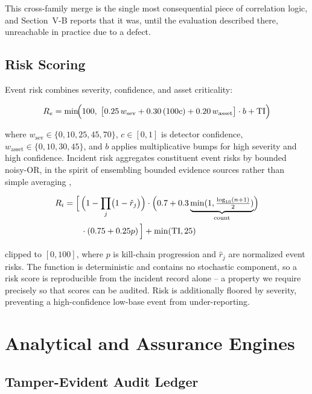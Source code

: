 \documentclass[conference]{IEEEtran}
\begin{document}
This cross-family merge is the single most consequential piece of
correlation logic, and Section~V-B reports that it was, until the evaluation
described there, unreachable in practice due to a defect.

\subsection{Risk Scoring}

Event risk combines severity, confidence, and asset criticality:

\begin{equation}
R_e = \min\!\Bigl(100,\;\bigl[0.25\,w_{\text{sev}} + 0.30\,(100 c) + 0.20\,w_{\text{asset}}\bigr] \cdot b + \text{TI}\Bigr)
\end{equation}

\noindent where $w_{\text{sev}} \in \{0,10,25,45,70\}$, $c \in [0,1]$ is
detector confidence, $w_{\text{asset}} \in \{0,10,30,45\}$, and $b$ applies
multiplicative bumps for high severity and high confidence. Incident risk
aggregates constituent event risks by bounded noisy-OR, in the spirit of
ensembling bounded evidence sources rather than simple averaging \cite{breiman2001random},

\begin{align}
R_i &= \Bigl[\,\Bigl(1 - \prod_{j}\bigl(1 - \hat{r}_j\bigr)\Bigr) \cdot
       \Bigl(0.7 + 0.3 \underbrace{\min(1, \tfrac{\log_{10}(n{+}1)}{2})}_{\text{count}}\Bigr) \\
&\qquad \cdot (0.75 + 0.25 p)\,\Bigr] + \min(\text{TI}, 25)
\end{align}

\noindent clipped to $[0,100]$, where $p$ is kill-chain progression and $\hat{r}_j$ are normalized event risks. The function is deterministic and contains no stochastic component, so a risk score is reproducible from the incident record alone -- a property we require precisely so that scores can be audited. Risk is additionally floored by severity, preventing a high-confidence low-base event from under-reporting.

\section{Analytical and Assurance Engines}

\subsection{Tamper-Evident Audit Ledger}
\end{document}
